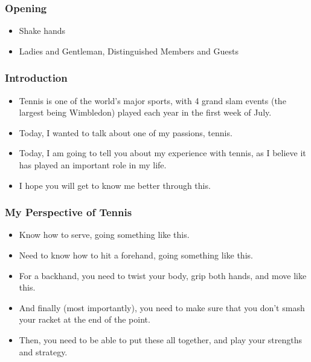 \begin{frame}
\frametitle{Opening}
\begin{itemize}
\item Shake hands 
\item Ladies and Gentleman, Distinguished Members and Guests 
\end{itemize}
\end{frame} 

\begin{frame}
\frametitle{Introduction}
\begin{itemize}
\item \small Tennis is one of the world's major sports, with 4 grand
  slam events (the largest being Wimbledon) played each year in the
  first week of July. 
\item \small Today, I wanted to talk about one of my passions, tennis. 
\item \small Today, I am going to tell you about my experience 
with tennis, as I believe it has played an important role in my life. 
\item \small I hope you will get to know me better through this.  
\end{itemize} 
\end{frame} 

\begin{frame} 
\frametitle{My Perspective of Tennis}
\begin{itemize} 
\item \small Know how to serve, going something like this.
\item \small Need to know how to hit a forehand, going something like this. 
\item \small For a backhand, you need to twist your body, grip both
  hands, and move like this. 
\item \small And finally (most importantly), you need to make sure
  that you don't smash your racket at the end of the point. 
\item \small Then, you need to be able to put these all together, and
  play your strengths and strategy. 
\end{itemize}  
\end{frame} 

